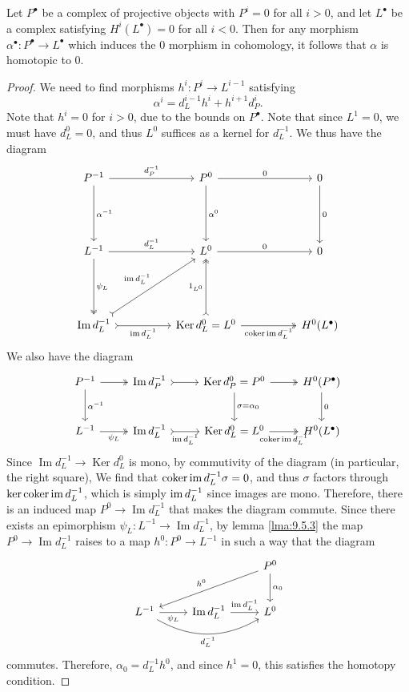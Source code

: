\begin{lemma}\label{lma:9.5.4}
	Let $P^{\bullet} $ be a complex of projective objects with $P^i=0$ for all $i>0$, and let $L^{\bullet} $ be a complex satisfying $H^i(L^{\bullet} )=0$ for all $i<0$. Then for any morphism $\alpha ^{\bullet} : P^{\bullet}  \to L^{\bullet} $ which induces the 0 morphism in cohomology, it follows that $\alpha $ is homotopic to $0$.
\end{lemma}
\begin{proof}
	We need to find morphisms $h^i : P^i \to L^{i-1} $ satisfying
	\[
		\alpha ^i=d_L^{i-1} h^i+h^{i+1} d_P^i
	.\]
	Note that $h^i=0$ for $i>0$, due to the bounds on $P^{\bullet} $. Note that since $L^1=0$, we must have $d_L^0=0$, and thus $L^0$ suffices as a kernel for $d_L^{-1} $. We thus have the diagram
	\[\begin{tikzcd}[row sep = 5em, column sep = 5em]
		P^{-1} \ar[r, "d_P^{-1} "]\ar[d, "\alpha ^{-1} "]&P^0\ar[r, "0"]\ar[d, "\alpha ^0"]&0\ar[d, "0"]\\
		L^{-1} \ar[d, two heads, "\psi _L"]\ar[r, "d_L^{-1} "]&L^0\ar[r, "0"]&0\\
		\operatorname{Im} d_L^{-1}\ar[r, tail, "\im d_L^{-1} "']\ar[ur, tail, "\im d_L^{-1} "]&\operatorname{Ker} d_L^0=L^0\ar[u, two heads, tail, "1_{L^0} "]\ar[r, two heads, "\coker \im d_L^{-1} "', two heads]&H^{0} (L^{\bullet} )
	\end{tikzcd}\]
	We also have the diagram
	\[\begin{tikzcd}[row sep = 2.5em, column sep = 2.5em]
		P^{-1} \ar[r, two heads]\ar[d, "\alpha ^{-1} "]&\operatorname{Im} d_P^{-1} \ar[r, tail]&\operatorname{Ker} d_P^{0}=P^0 \ar[d, "\sigma =\alpha _0"]\ar[r, two heads]&H^0(P^{\bullet} )\ar[d, "0"]\\
		L^{-1} \ar[r, two heads, "\psi _L"']&\operatorname{Im} d_L^{-1} \ar[r, "\im d_L^{-1} "', tail]&\operatorname{Ker} d_L^{0} =L^0\ar[r, "\coker \im d_L^{-1} "', two heads]&H^0(L^{\bullet} )
	\end{tikzcd}\]
	Since $\operatorname{Im} d_L^{-1} \to \operatorname{Ker} d_L^0$ is mono, by commutivity of the diagram (in particular, the right square), We find that $\operatorname{coker} \operatorname{im} d_L^{-1} \sigma =0$, and thus $\sigma $ factors through $\ker \operatorname{coker} \operatorname{im} d_L^{-1} $, which is simply $\operatorname{im} d_L^{-1} $ since images are mono. Therefore, there is an induced map $ P^0 \to \operatorname{Im} d_L^{-1}  $ that makes the diagram commute. Since there exists an epimorphism $\psi_L : L^{-1}  \to \operatorname{Im} d_L^{-1} $, by lemma \ref{lma:9.5.3} the map $P^0\to \operatorname{Im} d_L^{-1} $ raises to a map $h^0: P^0 \to L^{-1} $ in such a way that the diagram
	\[\begin{tikzcd}[row sep = 2.5em, column sep = 2.5em]
		&&P^0\ar[dll, "h^0"']\ar[d, "\alpha _{0} "]\\
		L^{-1} \ar[rr, bend right, "d_L^{-1} "']\ar[r, "\psi_L"']&\operatorname{Im} d_L^{-1} \ar[r, "\im d_L^{-1} "]&L^0
	\end{tikzcd}\]
	commutes. Therefore, $\alpha _0 = d_L^{-1} h^0$, and since $h^1=0$, this satisfies the homotopy condition.


\end{proof}
